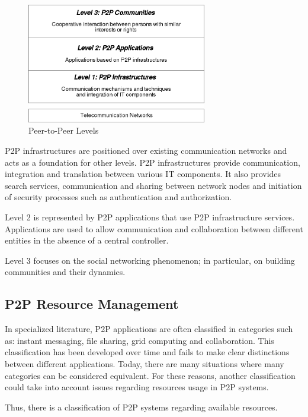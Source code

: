 \begin{figure}
  \centering
  \includegraphics[width=0.7\textwidth]{src/img/p2p-systems/p2p-levels}
  \caption{Peer-to-Peer Levels}
  \label{fig:p2p-systems:p2p-levels}
\end{figure}

P2P infrastructures are positioned over existing communication networks and
acts as a foundation for other levels. P2P infrastructures provide
communication, integration and translation between various IT components. It
also provides search services, communication and sharing between network
nodes and initiation of security processes such as authentication and
authorization.

Level 2 is represented by P2P applications that use P2P infrastructure
services. Applications are used to allow communication and collaboration
between different entities in the absence of a central controller.

Level 3 focuses on the social networking phenomenon; in particular, on building
communities and their dynamics.

\subsection{P2P Resource Management}

In specialized literature, P2P applications are often classified in categories
such as: instant messaging, file sharing, grid computing and collaboration.
This classification has been developed over time and fails to make clear
distinctions between different applications. Today, there are many situations
where many categories can be considered equivalent. For these reasons, another
classification could take into account issues regarding resources usage in P2P
systems.

Thus, there is a classification of P2P systems regarding available resources.


